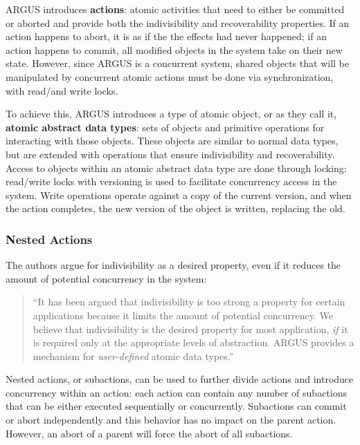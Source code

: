 ARGUS introduces \textbf{actions}: atomic activities that need to either be committed or aborted and provide both the indivisibility and recoverability properties.  If an action happens to abort, it is as if the the effects had never happened; if an action happens to commit, all modified objects in the system take on their new state.  However, since ARGUS is a concurrent system, shared objects that will be manipulated by concurrent atomic actions must be done via synchronization, with read/and write locks. 

To achieve this, ARGUS introduces a type of atomic object, or as they call it, \textbf{atomic abstract data types}: sets of objects and primitive operations for interacting with those objects.  These objects are similar to normal data types, but are extended with operations that ensure indivisibility and recoverability.  Access to objects within an atomic abstract data type are done through locking: read/write locks with versioning is used to facilitate concurrency access in the system.  Write operations operate against a copy of the current version, and when the action completes, the new version of the object is written, replacing the old.

\subsubsection{Nested Actions}


The authors argue for indivisibility as a desired property, even if it reduces the amount of potential concurrency in the system:

\begin{quote}
``It has been argued that indivisibility is too strong a property for certain applications because it limits the amount of potential concurrency.  We believe that indivisibility is the desired property for most application, \textit{if} it is required only at the appropriate levels of abstraction.  ARGUS provides a mechanism for \textit{user-defined} atomic data types.''	
\end{quote}

Nested actions, or subactions, can be used to further divide actions and introduce concurrency within an action: each action can contain any number of subactions that can be either executed sequentially or concurrently.  Subactions can commit or abort independently and this behavior has no impact on the parent action.  However, an abort of a parent will force the abort of all  subactions.

